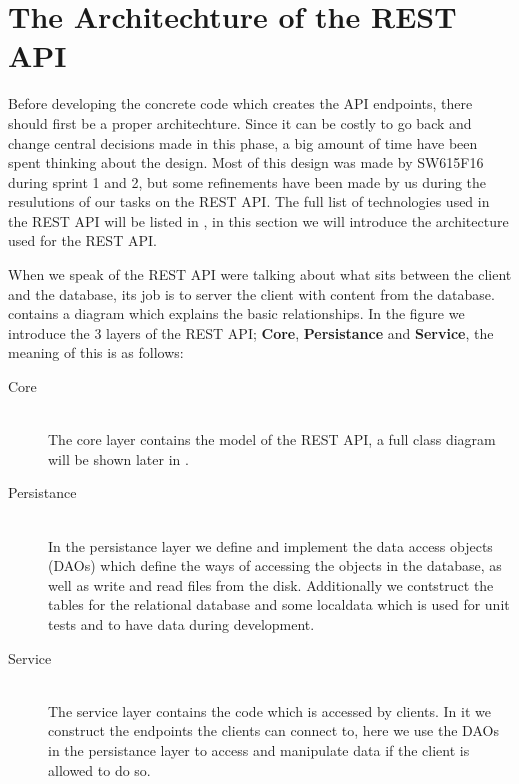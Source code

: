 \section{The Architechture of the REST API}
Before developing the concrete code which creates the API endpoints, there should first be a proper architechture. 
Since it can be costly to go back and change central decisions made in this phase, a big amount of time have been spent thinking about the design. 
Most of this design was made by SW615F16 during sprint 1 and 2, but some refinements have been made by us during the resulutions of our tasks on the REST API. 
The full list of technologies used in the REST API will be listed in , in this section we will introduce the architecture used for the REST API. 

When we speak of the REST API were talking about what sits between the client and the database, its job is to server the client with content from the database. 
 contains a diagram which explains the basic relationships. 
In the figure we introduce the 3 layers of the REST API; \textbf{Core}, \textbf{Persistance} and \textbf{Service}, the meaning of this is as follows:
\begin{description}
    \item[Core] \hfill \\ 
    The core layer contains the model of the REST API, a full class diagram will be shown later in .

    \item[Persistance] \hfill \\ 
    In the persistance layer we define and implement the data access objects (DAOs) which define the ways of accessing the objects in the database, as well as write and read files from the disk. 
    Additionally we contstruct the tables for the relational database and some localdata which is used for unit tests and to have data during development. 

    \item[Service] \hfill \\ 
    The service layer contains the code which is accessed by clients.
    In it we construct the endpoints the clients can connect to, here we use the DAOs in the persistance layer to access and manipulate data if the client is allowed to do so. 
\end{description}

